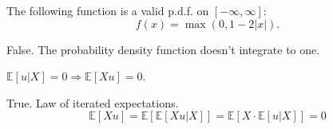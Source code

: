 \documentclass{exam}
\begin{document}
\begin{questions}
\begin{solution}
    \end{solution}


	\question The following function is a valid p.d.f. on $[-\infty, \infty]$:
		\[    f(x) = \max(0, 1 - 2 |x| ). \]

		\begin{solution}
		    False. The probability density function doesn't integrate to one.
		\end{solution}



    \question
    $\mathbb{E}[u|X] {=} 0 \Rightarrow \mathbb{E}[Xu] {=} 0$.
    \begin{solution}
    True. Law of iterated expectations. $$\mathbb{E}[X u] = \mathbb{E}[\mathbb{E}[X u|X]] = \mathbb{E}[X \cdot \mathbb{E}[u|X]] = 0$$
    \end{solution}



\end{questions}
\end{document}
